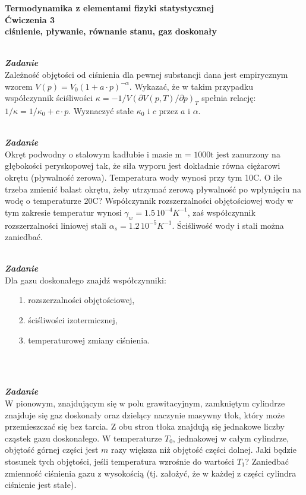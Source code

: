 \documentclass[11pt,a4paper]{article}
\newcounter{zadanie}\newcommand{\zadanie}[1][]{\addtocounter{zadanie}{1} ~\\  {\bf \emph{Zadanie \arabic{zadanie} #1 }} \\}
\begin{document}
\vspace*{-1.8cm}

\begin{centering}
\bf{\Large{Termodynamika z elementami fizyki statystycznej}}\\
Ćwiczenia 3 \\[1mm]
ciśnienie, pływanie, równanie stanu, gaz doskonały \\
\end{centering}

\zadanie
Zależność objętości od ciśnienia dla pewnej substancji dana jest empirycznym wzorem $V(p) = V_0(1 + a\cdot p)^{-\alpha}$.
Wykazać, że w takim przypadku współczynnik ściśliwości $\kappa=-1/V(\partial V(p,T)/\partial p)_T$ spełnia relację: $1/\kappa=1/\kappa_0+c\cdot p$.
Wyznaczyć stałe $\kappa_0$ i $c$ przez $a$ i $\alpha$.

\zadanie
Okręt podwodny o stalowym kadłubie i masie m = $1000\textrm{t}$ jest zanurzony na głębokości peryskopowej tak, że siła wyporu jest dokładnie równa ciężarowi okrętu (pływalność zerowa). Temperatura wody wynosi przy tym 10\degree C. O ile trzeba zmienić balast okrętu, żeby utrzymać zerową pływalność po wpłynięciu na wodę o temperaturze 20\degree C? Współczynnik rozszerzalności objętościowej wody w tym zakresie temperatur wynosi $\gamma_w = 1.5\,10^{-4} K^{-1}$, zaś współczynnik rozszerzalności liniowej stali $\alpha_s = 1.2\,10^{-5} K^{-1}$. Ściśliwość wody i stali można zaniedbać.


\zadanie
Dla gazu doskonałego znajdź współczynniki:
\begin{itemize}
\item[1.] rozszerzalności objętościowej,
\item[2.] ściśliwości izotermicznej,
\item[3.] temperaturowej zmiany ciśnienia.
\end{itemize}
\phantom{.} \\
\zadanie
W pionowym, znajdującym się w polu grawitacyjnym, zamkniętym cylindrze znajduje się gaz doskonały oraz dzielący naczynie masywny tłok, który może przemieszczać się bez tarcia. Z obu stron tłoka znajdują się jednakowe liczby cząstek gazu doskonałego. W temperaturze $T_0$, jednakowej w całym cylindrze, objętość górnej części jest $m$ razy większa niż objętość części dolnej. Jaki będzie stosunek tych objętości, jeśli temperatura wzrośnie do wartości $T_1$? Zaniedbać zmienność ciśnienia gazu z wysokością (tj. założyć, że w każdej z części cylindra ciśnienie jest stałe).
\end{document}
